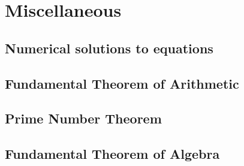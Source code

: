 \documentclass[fleqn,a4paper,11pt]{article}
\newtheorem{thm}{Theorem}
\begin{document}

    \section{Miscellaneous}

%

    \subsection{Numerical solutions to equations}

    \subsection{Fundamental Theorem of Arithmetic}

    \subsection{Prime Number Theorem}

    \subsection{Fundamental Theorem of Algebra}
\end{document}
